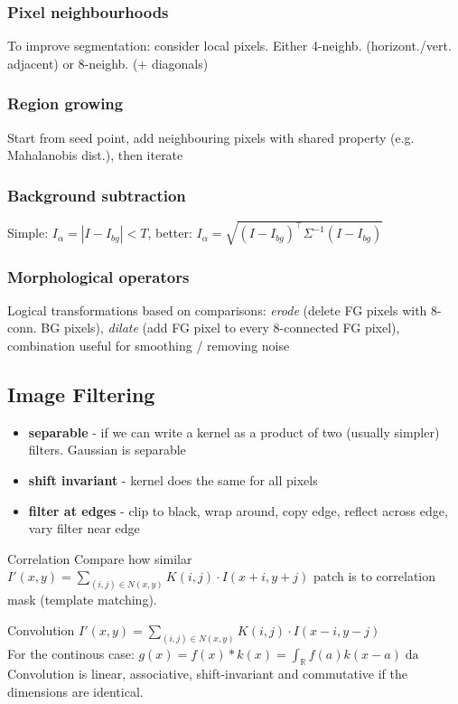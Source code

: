 \documentclass[a4paper,10pt]{article}
\begin{document}
\subsubsection{Pixel neighbourhoods}
To improve segmentation: consider local pixels. Either 4-neighb. (horizont./vert. adjacent) or 8-neighb. (+ diagonals)

\subsubsection{Region growing}
Start from seed point, add neighbouring pixels with shared property (e.g. Mahalanobis dist.), then iterate

\subsubsection{Background subtraction}
Simple: \( I_\alpha = \left| I - I_{bg} \right| < T \), better: \( I_\alpha = \sqrt{(I-I_{bg})^\top \Sigma^{-1} (I-I_{bg})}  \)

\subsubsection{Morphological operators} 
Logical transformations based on comparisons: \textit{erode} (delete FG pixels with 8-conn. BG pixels), \textit{dilate} (add FG pixel to every 8-connected FG pixel), combination useful for smoothing / removing noise

\subsection{Image Filtering}
\begin{itemize}
    \item \textbf{separable} - if we can write a kernel as a product of two (usually simpler) filters. Gaussian is separable
    \item \textbf{shift invariant} - kernel does the same for all pixels
    \item \textbf{filter at edges} - clip to black, wrap around, copy edge, reflect across edge, vary filter near edge
\end{itemize}
\begin{mainbox}{Correlation}
    Compare how similar \( I'(x,y) = \sum_{(i,j) \in N(x,y)} K(i,j) \cdot I(x+i,y+j) \) patch is to correlation mask (template matching).
\end{mainbox}

\begin{mainbox}{Convolution}
    \( I'(x,y) = \sum_{(i,j) \in N(x,y)} K(i,j) \cdot I(x-i, y-j) \)\\
    For the continous case: \( g(x) = f(x) * k(x) = \int_\mathbb{R} f(a) k(x-a) \mathop{da}  \)\\
    Convolution is linear, associative, shift-invariant and commutative if the dimensions are identical.
\end{mainbox}
\end{document}
